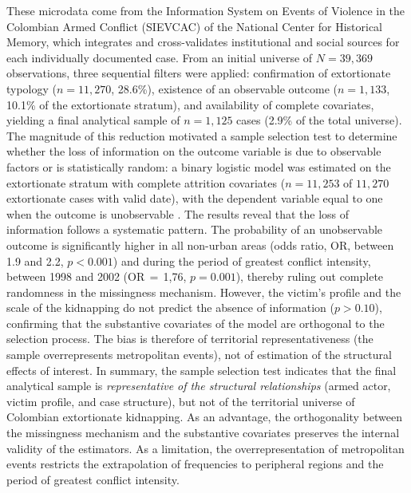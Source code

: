 \documentclass[ecta,nameyear,draft]{econsocart}
\theoremstyle{plain}
\theoremstyle{definition}
\newcommand{\1}{\mathbf{1}}
\begin{document}
These microdata come from the Information System on Events of Violence in the Colombian Armed Conflict (SIEVCAC) of the National Center for Historical Memory, which integrates and cross-validates institutional and social sources for each individually documented case. From an initial universe of $N=39,369$ observations, three sequential filters were applied: confirmation of extortionate typology ($n=11,270$, 28.6\%), existence of an observable outcome ($n=1,133$, 10.1\% of the extortionate stratum), and availability of complete covariates, yielding a final analytical sample of $n=1,125$ cases (2.9\% of the total universe). The magnitude of this reduction motivated a sample selection test to determine whether the loss of information on the outcome variable is due to observable factors or is statistically random: a binary logistic model was estimated on the extortionate stratum with complete attrition covariates ($n=11,253$ of $11,270$ extortionate cases with valid date), with the dependent variable equal to one when the outcome is unobservable \citet{LittleRubin2020}. The results reveal that the loss of information follows a systematic pattern. The probability of an unobservable outcome is significantly higher in all non-urban areas (odds ratio, OR, between 1.9 and 2.2, $p<0.001$) and during the period of greatest conflict intensity, between 1998 and 2002 (OR$\,=\,$1{,}76, $p=0.001$), thereby ruling out complete randomness in the missingness mechanism. However, the victim's profile and the scale of the kidnapping do not predict the absence of information ($p>0.10$), confirming that the substantive covariates of the model are orthogonal to the selection process. The bias is therefore of territorial representativeness (the sample overrepresents metropolitan events), not of estimation of the structural effects of interest. In summary, the sample selection test indicates that the final analytical sample is \textit{representative of the structural relationships} (armed actor, victim profile, and case structure), but not of the territorial universe of Colombian extortionate kidnapping. As an advantage, the orthogonality between the missingness mechanism and the substantive covariates preserves the internal validity of the estimators. As a limitation, the overrepresentation of metropolitan events restricts the extrapolation of frequencies to peripheral regions and the period of greatest conflict intensity.
\end{document}
